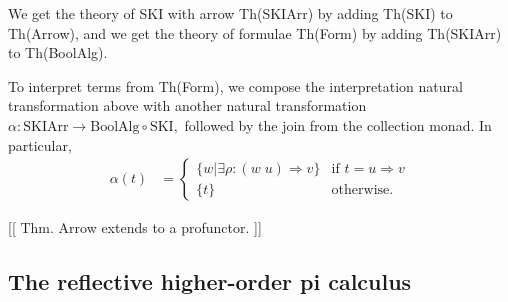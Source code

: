 \documentclass{article}
\newcommand{\maps}{\colon}
\newcommand{\lhom}{\Rightarrow}
\begin{document}
We get the theory of SKI with arrow Th(SKIArr) by adding Th(SKI) to Th(Arrow), and we get the theory of formulae Th(Form) by adding Th(SKIArr) to Th(BoolAlg).

To interpret terms from Th(Form), we compose the interpretation natural transformation above with another natural transformation $\alpha\maps \mathrm{SKIArr} \to \mathrm{BoolAlg} \circ \mathrm{SKI},$ followed by the join from the collection monad.  In particular, 
\begin{align*}
  \alpha(t) &= \begin{cases}
    \{ w | \exists \rho\maps (w\; u) \Rightarrow v \} & \text{if } t = u \lhom v\\
    \{ t \} & \text{otherwise.}
  \end{cases}
\end{align*}

[[ Thm.  Arrow extends to a profunctor. ]]

\subsection{The reflective higher-order pi calculus}
\end{document}
